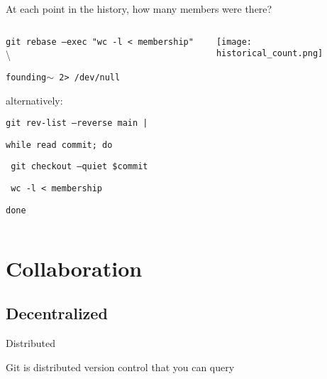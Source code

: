 \documentclass{beamer}
\begin{document}
\begin{frame}
    \centering
    \Large At each point in the history, how many members were there?

    \pause
    \vspace{\baselineskip}

    \begin{columns}[onlytextwidth]
        \begin{column}{0.85\textwidth}
            \small{\texttt{git rebase --exec "wc -l < membership"} \textbackslash

            \texttt{founding$\sim$ 2> /dev/null}

                \vspace{\baselineskip}
                alternatively:
                \vspace{\baselineskip}

                \texttt{git rev-list --reverse main |}

                \texttt{while read commit; do}

                \texttt{    git checkout --quiet \$commit}

                \texttt{    wc -l < membership}

                \texttt{done}}
        \end{column}
        \begin{column}{0.15\textwidth}
            \texttt{[image: historical\_count.png]}
        \end{column}
    \end{columns}
\end{frame}

\section{Collaboration}

\subsection{Decentralized}

\begin{frame}{Distributed}
    \begin{center}
        \huge Git is distributed version control that you can query
    \end{center}
\end{frame}
\end{document}
